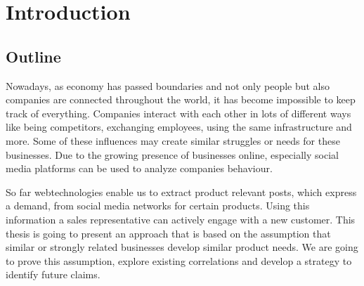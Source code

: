 \section{Introduction}

\subsection{Outline}

Nowadays, as economy has passed boundaries and not only people but also companies are connected throughout the world,
it has become impossible to keep track of everything. Companies interact with each other in lots of different ways like
being competitors, exchanging employees, using the same infrastructure and more. Some of these influences may create
similar struggles or needs for these businesses. Due to the growing presence of businesses online, especially
social media platforms can be used to analyze companies behaviour.

So far webtechnologies enable us to extract product relevant posts, which express a demand,
from social media networks for certain products. Using this information a sales representative can
actively engage with a new customer. This thesis is going to present an approach that is based on the assumption
that similar or strongly related businesses develop similar product needs. We are going to prove this assumption,
explore existing correlations and develop a strategy to identify future claims.
